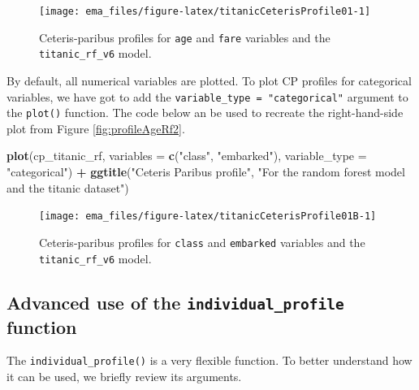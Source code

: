 \documentclass[]{krantz}
\newenvironment{Shaded}{\begin{snugshade}}{\end{snugshade}}
\newcommand{\DataTypeTok}[1]{\textcolor[rgb]{0.13,0.29,0.53}{#1}}
\newcommand{\KeywordTok}[1]{\textcolor[rgb]{0.13,0.29,0.53}{\textbf{#1}}}
\newcommand{\NormalTok}[1]{#1}
\newcommand{\OperatorTok}[1]{\textcolor[rgb]{0.81,0.36,0.00}{\textbf{#1}}}
\newcommand{\StringTok}[1]{\textcolor[rgb]{0.31,0.60,0.02}{#1}}
\begin{document}
\begin{figure}

{\centering \texttt{[image: ema\_files/figure-latex/titanicCeterisProfile01-1]} 

}

\caption{Ceteris-paribus profiles for \texttt{age} and \texttt{fare} variables and the \texttt{titanic\_rf\_v6} model.}\label{fig:titanicCeterisProfile01}
\end{figure}

By default, all numerical variables are plotted.
To plot CP profiles for categorical variables, we have got to add the \texttt{variable\_type\ =\ "categorical"} argument to the \texttt{plot()} function. The code below an be used to recreate the right-hand-side plot from Figure \ref{fig:profileAgeRf2}.



\begin{Shaded}
\begin{Highlighting}[]
\KeywordTok{plot}\NormalTok{(cp_titanic_rf, }\DataTypeTok{variables =} \KeywordTok{c}\NormalTok{(}\StringTok{"class"}\NormalTok{, }\StringTok{"embarked"}\NormalTok{), }
     \DataTypeTok{variable_type =} \StringTok{"categorical"}\NormalTok{) }\OperatorTok{+}
\StringTok{  }\KeywordTok{ggtitle}\NormalTok{(}\StringTok{"Ceteris Paribus profile"}\NormalTok{, }
            \StringTok{"For the random forest model and the titanic dataset"}\NormalTok{)}
\end{Highlighting}
\end{Shaded}

\begin{figure}

{\centering \texttt{[image: ema\_files/figure-latex/titanicCeterisProfile01B-1]} 

}

\caption{Ceteris-paribus profiles for \texttt{class} and \texttt{embarked} variables and the \texttt{titanic\_rf\_v6} model.}\label{fig:titanicCeterisProfile01B}
\end{figure}

\hypertarget{advanced-use-of-the-individual_profile-function}{%
\subsection{\texorpdfstring{Advanced use of the \texttt{individual\_profile} function}{Advanced use of the individual\_profile function}}\label{advanced-use-of-the-individual_profile-function}}

The \texttt{individual\_profile()} is a very flexible function. To better understand how it can be used, we briefly review its arguments.
\end{document}
